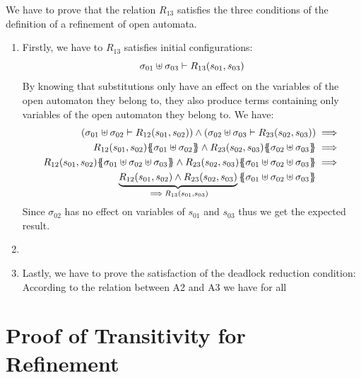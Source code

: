 \documentclass[runningheads]{llncs}
\begin{document}
We have to prove that the relation $R_{13}$ satisfies the three conditions of the definition of a refinement of open automata.
\begin{enumerate}
\item Firstly, we have to $R_{13}$ satisfies initial configurations:
\[\sigma_{01} \uplus \sigma_{03} \vdash R_{13} {\left(s_{01}, s_{03}\right)}\]
By knowing that substitutions only have an effect on the variables of the open automaton they belong to, they also produce terms containing only variables of the open automaton they belong to. We have:
\begin{align*}
\mpar{\sigma_{01} \uplus \sigma_{02} \vdash R_{12}\mpar{s_{01}, s_{02}}} \wedge \mpar
{\sigma_{02} \uplus \sigma_{03} \vdash R_{23}\mpar{s_{02}, s_{03}}}&\implies\\
R_{12}\mpar{s_{01},s_{02}}\psubst{\sigma_{01} \uplus \sigma_{02}} \wedge R_{23}\mpar{s_{02}, s_{03}}\psubst{\sigma_{02} \uplus \sigma_{03}}&\implies\\
R_{12}\mpar{s_{01},s_{02}}\psubst{\sigma_{01} \uplus \sigma_{02} \uplus \sigma_{03}} \wedge R_{23}\mpar{s_{02}, s_{03}}\psubst{\sigma_{01} \uplus \sigma_{02} \uplus \sigma_{03}}&\implies\\ 
\underbrace{R_{12}\mpar{s_{01},s_{02}}\wedge R_{23}\mpar{s_{02}, s_{03}}}_{\implies R_{13} \mpar{s_{01}, s_{03}}}\psubst{\sigma_{01} \uplus \sigma_{02} \uplus \sigma_{03}} %
 \end{align*}
Since $\sigma_{02}$ has no effect on variables of $s_{01}$ and $s_{03}$ thus we get the expected result.

\item {}

\item Lastly, we have to prove the satisfaction of the deadlock reduction condition:
According to the relation between A2 and A3 we have for all



\end{enumerate}











\section{Proof of Transitivity for Refinement}\label{sec:proof-transitivity}
\end{document}
